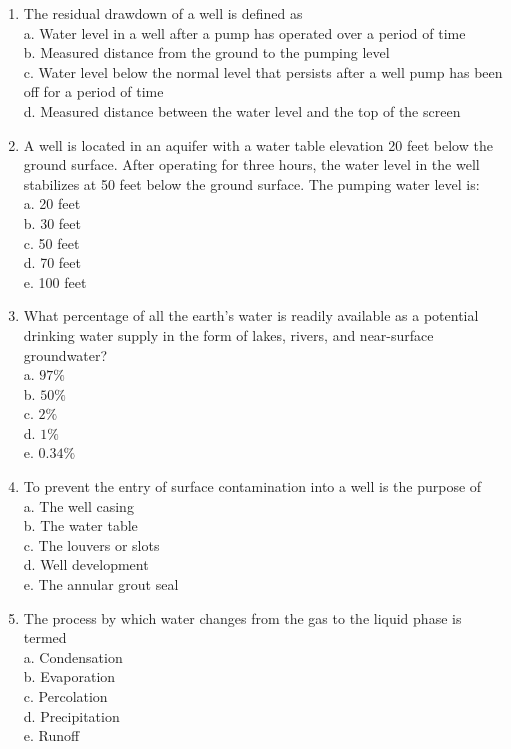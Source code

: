 \begin{enumerate}
\item The residual drawdown of a well is defined as\\
a. Water level in a well after a pump has operated over a period of time\\
b. Measured distance from the ground to the pumping level\\
c. Water level below the normal level that persists after a well pump has been off for a period of time\\
d. Measured distance between the water level and the top of the screen\\

\item A well is located in an aquifer with a water table elevation 20 feet below the ground surface. After operating for three hours, the water level in the well stabilizes at 50 feet below the ground surface. The pumping water level is:\\
a. 20 feet\\
b. 30 feet\\
c. 50 feet\\
d. 70 feet\\
e. 100 feet\\

\item What percentage of all the earth's water is readily available as a potential drinking water supply in the form of lakes, rivers, and near-surface groundwater?\\
a. $97 \%$\\
b. $50 \%$\\
c. $2 \%$\\
d. $1 \%$\\
e. $0.34 \%$\\

\item To prevent the entry of surface contamination into a well is the purpose of\\
a. The well casing\\
b. The water table\\
c. The louvers or slots\\
d. Well development\\
e. The annular grout seal\\

\item The process by which water changes from the gas to the liquid phase is termed\\
a. Condensation\\
b. Evaporation\\
c. Percolation\\
d. Precipitation\\
e. Runoff\\


\end{enumerate}
